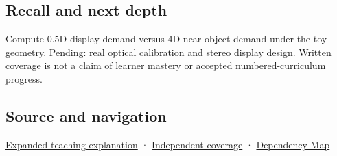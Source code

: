 \subsection{Recall and next depth}\label{appendix-f90cee1be7a4-recall-and-next-depth}

Compute 0.5D display demand versus 4D near-object demand under the toy geometry. Pending: real optical calibration and stereo display design. Written coverage is not a claim of learner mastery or accepted numbered-curriculum progress.

\subsection{Source and navigation}\label{appendix-f90cee1be7a4-source-and-navigation}

\hyperref[04-visual-computing-ii-ch042-focus-and-stereo-can-disagree-even-when-the-images-are-sharp]{Expanded teaching explanation} · \hyperref[appendix-fd090d982a15-xr01---independent-seeing-and-representation-source]{Independent coverage} · \hyperref[appendix-4ad47bdd269a]{Dependency Map}
